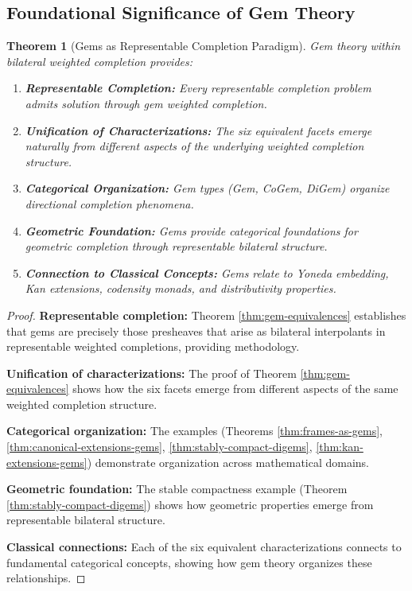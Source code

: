 \documentclass[11pt]{article}
\theoremstyle{plain}
\newtheorem{theorem}{Theorem}[section]
\theoremstyle{definition}
\theoremstyle{remark}
\begin{document}
\subsection{Foundational Significance of Gem Theory}

\begin{theorem}[Gems as Representable Completion Paradigm]\label{thm:gem-paradigm}
Gem theory within bilateral weighted completion provides:

\begin{enumerate}
\item \textbf{Representable Completion:} Every representable completion problem admits solution through gem weighted completion.

\item \textbf{Unification of Characterizations:} The six equivalent facets emerge naturally from different aspects of the underlying weighted completion structure.

\item \textbf{Categorical Organization:} Gem types (Gem, CoGem, DiGem) organize directional completion phenomena.

\item \textbf{Geometric Foundation:} Gems provide categorical foundations for geometric completion through representable bilateral structure.

\item \textbf{Connection to Classical Concepts:} Gems relate to Yoneda embedding, Kan extensions, codensity monads, and distributivity properties.
\end{enumerate}
\end{theorem}

\begin{proof}
\textbf{Representable completion:} Theorem \ref{thm:gem-equivalences} establishes that gems are precisely those presheaves that arise as bilateral interpolants in representable weighted completions, providing methodology.

\textbf{Unification of characterizations:} The proof of Theorem \ref{thm:gem-equivalences} shows how the six facets emerge from different aspects of the same weighted completion structure.

\textbf{Categorical organization:} The examples (Theorems \ref{thm:frames-as-gems}, \ref{thm:canonical-extensions-gems}, \ref{thm:stably-compact-digems}, \ref{thm:kan-extensions-gems}) demonstrate organization across mathematical domains.

\textbf{Geometric foundation:} The stable compactness example (Theorem \ref{thm:stably-compact-digems}) shows how geometric properties emerge from representable bilateral structure.

\textbf{Classical connections:} Each of the six equivalent characterizations connects to fundamental categorical concepts, showing how gem theory organizes these relationships.
\end{proof}
\end{document}
